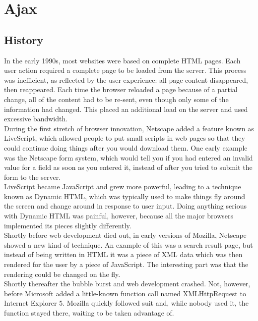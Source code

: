 \section{Ajax}
\label{sec:ajax}
	
\subsection{History}
In the early 1990s, most websites were based on complete HTML pages. Each user action required a complete page to be loaded from the server. This process was inefficient, as reflected by the user experience: all page content disappeared, then reappeared. Each time the browser reloaded a page because of a partial change, all of the content had to be re-sent, even though only some of the information had changed. This placed an additional load on the server and used excessive bandwidth.\\

During the first stretch of browser innovation, Netscape added a feature known as LiveScript, which allowed people to put small scripts in web pages so that they could continue doing things after you would download them. One early example was the Netscape form system, which would tell you if you had entered an invalid value for a field as soon as you entered it, instead of after you tried to submit the form to the server.\\

LiveScript became JavaScript and grew more powerful, leading to a technique known as Dynamic HTML, which was typically used to make things fly around the screen and change around in response to user input. Doing anything serious with Dynamic HTML was painful, however, because all the major browsers implemented its pieces slightly differently.\\

Shortly before web development died out, in early versions of Mozilla, Netscape showed a new kind of technique. An example of this was a search result page, but instead of being written in HTML it was a piece of XML data which was then rendered for the user by a piece of JavaScript. The interesting part was that the rendering could be changed on the fly.\\

Shortly thereafter the bubble burst and web development crashed. Not, however, before Microsoft added a little-known function call named XMLHttpRequest to Internet Explorer 5. Mozilla quickly followed suit and, while nobody used it, the function stayed there, waiting to be taken advantage of.\\

